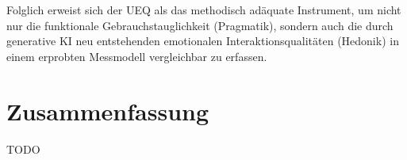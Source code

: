 Folglich erweist sich der UEQ als das methodisch adäquate Instrument, um nicht nur die funktionale Gebrauchstauglichkeit (Pragmatik), sondern auch die durch generative KI neu entstehenden emotionalen Interaktionsqualitäten (Hedonik) in einem erprobten Messmodell vergleichbar zu erfassen.


\section{Zusammenfassung}
TODO
